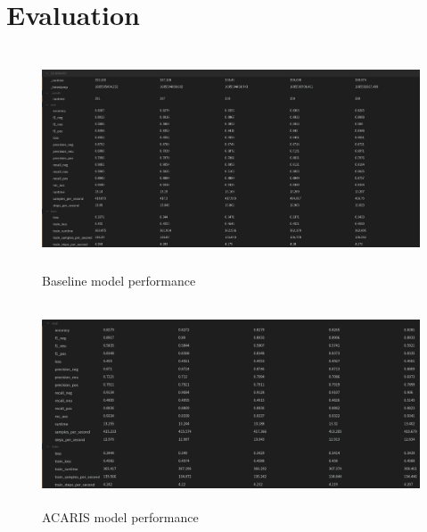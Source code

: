 \documentclass{article}
\begin{document}
\section{Evaluation}
\begin{figure}[h!]
	\centering
	\includegraphics[width=\textwidth,height=6.5cm]{images/baseline.png}
	\caption{Baseline model performance\cite{wandb}}
	\label{fig:baseline}
\end{figure}
\begin{figure}[h!]
	\centering
	\includegraphics[width=\textwidth,height=6cm]{images/ACARIS.png}
	\caption{ACARIS model performance\cite{wandb}}
	\label{fig:ACARIS}
\end{figure}
\end{document}
